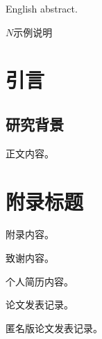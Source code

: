 \documentclass[master]{shtthesis}
\begin{document}
\maketitle

\frontmatter

\begin{abstract}
中文摘要。
\end{abstract}

\begin{abstract*}
English abstract.
\end{abstract*}

\makeindices

\begin{nomenclatures}
  \item[$\symup{1}$]{$N$}{示例说明}
\end{nomenclatures}

\mainmatter

\chapter{引言}

\section{研究背景}
正文内容。

\makebiblio

\appendix
\chapter{附录标题}
附录内容。

\backmatter

\begin{acknowledgement}
致谢内容。
\end{acknowledgement}

\begin{resume}
个人简历内容。
\end{resume}

\begin{publications}
论文发表记录。
\end{publications}

\begin{publications*}
匿名版论文发表记录。
\end{publications*}
\end{document}
